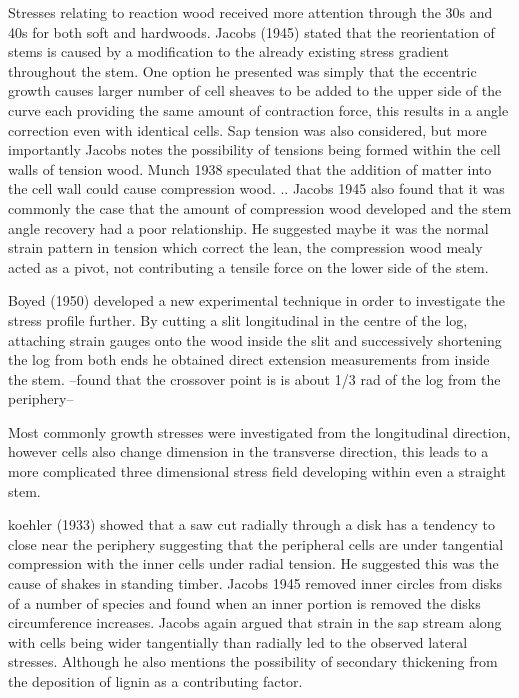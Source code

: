 \documentclass{article}
\begin{document}
Stresses relating to reaction wood received more attention through the 30s and
40s for both soft and hardwoods. Jacobs (1945) stated that the reorientation of
stems is caused by a modification to the already existing stress gradient
throughout the stem. One option he presented was simply that the eccentric
growth causes larger number of cell sheaves to be added to the upper side of the
curve each providing the same amount of contraction force, this results in a
angle correction even with identical cells. Sap tension was also considered, but
more importantly Jacobs notes the possibility of tensions being formed within the
cell walls of tension wood.
Munch 1938 speculated that the addition of matter into the cell wall could cause
compression wood. ..
Jacobs 1945 also found that it was commonly the case that the amount of
compression wood developed and the stem angle recovery had a poor relationship.
He suggested maybe it was the normal strain pattern in tension which
correct the lean, the compression wood mealy acted as a pivot, not contributing
a tensile force on the lower side of the stem.

Boyed (1950) developed a new experimental technique in order to investigate the
stress profile further. By cutting a slit longitudinal in the centre of the
log, attaching strain gauges onto the wood inside the slit and successively
shortening the log from both ends he obtained direct extension measurements from
inside the stem. --found that the crossover point is is about 1/3 rad of the log
from the periphery--

Most commonly growth stresses were investigated from the longitudinal direction,
however cells also change dimension in the transverse direction, this leads to a
more complicated three dimensional stress field developing within even a
straight stem.

koehler (1933) showed that a saw cut radially through a disk has a tendency to
close near the periphery suggesting that the peripheral cells are under
tangential compression with the inner cells under radial tension. He suggested this was the
cause of shakes in standing timber.
Jacobs 1945 removed inner circles from disks of a number of species and found
when an inner portion is removed the disks circumference increases. Jacobs again
argued that strain in the sap stream along with cells being wider tangentially
than radially led to the observed lateral stresses. Although he also mentions
the possibility of secondary thickening from the deposition of lignin as a
contributing factor.
\end{document}
